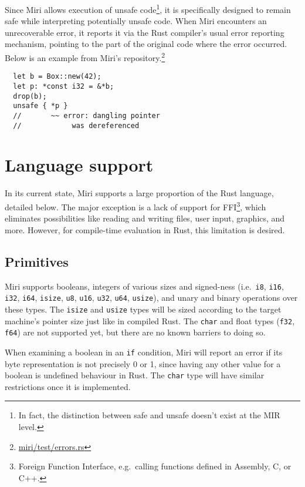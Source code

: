 \documentclass[twocolumn]{article}
\newcommand{\rust}[1]{\texttt{#1}}
\begin{document}
Since Miri allows execution of unsafe code\footnote{In fact, the distinction between safe and unsafe
doesn't exist at the MIR level.}, it is specifically designed to remain safe while interpreting
potentially unsafe code. When Miri encounters an unrecoverable error, it reports it via the Rust
compiler's usual error reporting mechanism, pointing to the part of the original code where the
error occurred. Below is an example from Miri's
repository.\footnote{\href{https://github.com/tsion/miri/blob/master/test/errors.rs}{miri/test/errors.rs}}

\begin{verbatim}
  let b = Box::new(42);
  let p: *const i32 = &*b;
  drop(b);
  unsafe { *p }
  //       ~~ error: dangling pointer
  //            was dereferenced
\end{verbatim}
\label{dangling-pointer}


\section{Language support}

In its current state, Miri supports a large proportion of the Rust language, detailed below. The
major exception is a lack of support for  FFI\footnote{Foreign Function Interface, e.g.\ calling
functions defined in Assembly, C, or C++.}, which eliminates possibilities like reading and writing
files, user input, graphics, and more. However, for compile-time evaluation in Rust, this limitation
is desired.

\subsection{Primitives}

Miri supports booleans, integers of various sizes and signed-ness (i.e.\ \rust{i8}, \rust{i16},
\rust{i32}, \rust{i64}, \rust{isize}, \rust{u8}, \rust{u16}, \rust{u32}, \rust{u64}, \rust{usize}),
and unary and binary operations over these types. The \rust{isize} and \rust{usize} types will be
sized according to the target machine's pointer size just like in compiled Rust. The \rust{char} and
float types (\rust{f32}, \rust{f64}) are not supported yet, but there are no known barriers to doing
so.

When examining a boolean in an \rust{if} condition, Miri will report an error if its byte
representation is not precisely 0 or 1, since having any other value for a boolean is undefined
behaviour in Rust. The \rust{char} type will have similar restrictions once it is implemented.
\end{document}
